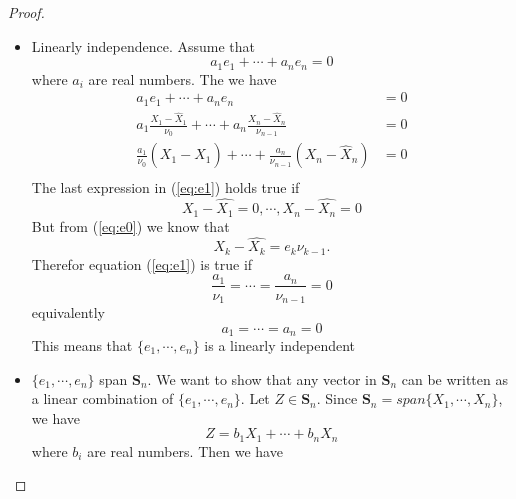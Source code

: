 \documentclass[11pt, oneside]{article}   	%
\begin{document}
\begin{proof}
\begin{itemize}
\item Linearly independence.
Assume that 
\begin{equation}
  a_{1}e_{1}+\cdots+a_{n}e_{n} = 0
  \end{equation}
  where $a_{i}$ are real numbers. The we have 
\begin{equation}\label{eq:e1}
\begin{split}
a_{1}e_{1}+\cdots+a_{n}e_{n} &= 0\\
a_{1}\frac{X_{1}-\hat{X}_{1}}{\nu_{0}}+\cdots+a_{n}\frac{X_{n}-\hat{X}_{n}}{\nu_{n-1}} &= 0\\
\frac{a_{1}}{\nu_{0}}(X_{1}-\hat{X}_{1}) + \cdots+ \frac{a_{n}}{\nu_{n-1}}(X_{n}-\hat{X}_{n}) &=0\\
\end{split}
\end{equation}
The last expression in (\ref{eq:e1}) holds true if 
\begin{equation}
X_{1} -\hat{X_{1}} = 0 , \cdots, X_{n}-\hat{X_{n}} = 0 
\end{equation} 
But from (\ref{eq:e0}) we know that 
\begin{equation}
X_{k}-\hat{X_{k}} = e_{k}\nu_{k-1}.
\end{equation}
Therefor equation (\ref{eq:e1}) is true if 
\begin{equation}
\frac{a_{1}}{\nu_{1}} = \cdots =\frac{a_{n}}{\nu_{n-1}} = 0
\end{equation} 
equivalently 
\begin{equation}
a_{1} = \cdots =a_{n} = 0
\end{equation}
This means that $\{e_{1},\cdots,e_{n}\}$ is a linearly independent
 
\item $\{e_{1},\cdots,e_{n}\}$ span $\textbf{S}_{n}$. We want to show that any vector in $\textbf{S}_{n}$ can be written as a linear combination of $\{e_{1},\cdots,e_{n}\}$.
Let $Z \in \textbf{S}_{n}$. Since $\textbf{S}_{n} = span\{ X_{1},\cdots, X_{n}  \}$, we have 
\begin{equation}
Z = b_{1}X_{1} + \cdots + b_{n}X_{n}
\end{equation}
where $b_{i}$ are real numbers. Then we have 


\end{itemize}
\end{proof}
\end{document}
